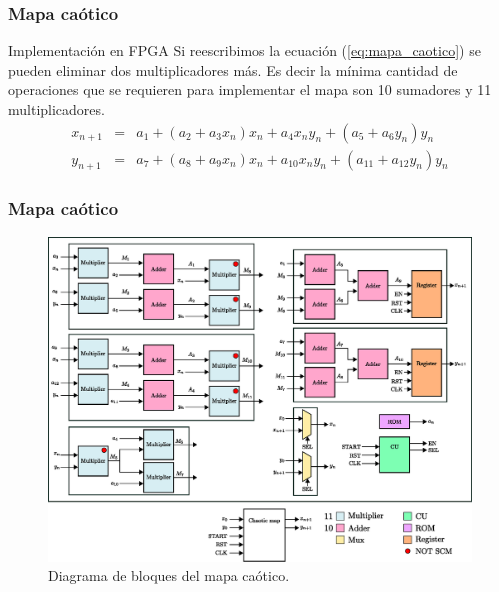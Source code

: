 \documentclass[10pt]{beamer}
\begin{document}
\begin{frame}
    \frametitle{Mapa caótico}
    \begin{block}{Implementación en FPGA}
        \justifying
        Si reescribimos la ecuación (\ref{eq:mapa_caotico})  se pueden eliminar dos multiplicadores más. Es decir la mínima cantidad de operaciones que se requieren para implementar el mapa son 10 sumadores y 11 multiplicadores.
        \begin{equation}
            \begin{array}{ccl}
                     x_{n+1} & = &  a_{1} + ( a_{2} + a_{3}x_{n} )x_{n} + a_{4}x_{n}y_{n} + ( a_{5} + a_{6}y_{n} )y_{n} \\
                    y_{n+1} & = &  a_{7} + ( a_{8} + a_{9}x_{n} )x_{n} + a_{10}x_{n}y_{n} + ( a_{11} + a_{12}y_{n})y_{n}
                \end{array}
	    \end{equation}
	\end{block}
\end{frame}


\begin{frame}
    \frametitle{Mapa caótico}
        \begin{figure}[hbtp]
            \centering
            \includegraphics[width=0.8\linewidth]{B1_architecture}
            \caption{Diagrama de bloques del mapa caótico.}
            \label{fig:B1_architecture}
        \end{figure}
\end{frame}
\end{document}
